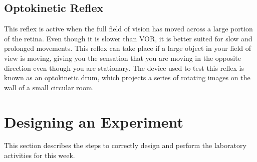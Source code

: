 \documentclass{article}
\begin{document}
\subsection*{Optokinetic Reflex}
This reflex is active when the full field of vision has moved across a large portion of the retina. Even though it is slower than VOR, it is better suited for slow and prolonged movements. This reflex can take place if a large object in your field of view is moving, giving you the sensation that you are moving in the opposite direction even though you are stationary. The device used to test this reflex is known as an optokinetic drum, which projects a series of rotating images on the wall of a small circular room.

\section*{Designing an Experiment}
This section describes the steps to correctly design and perform the laboratory activities for this week.
\end{document}
